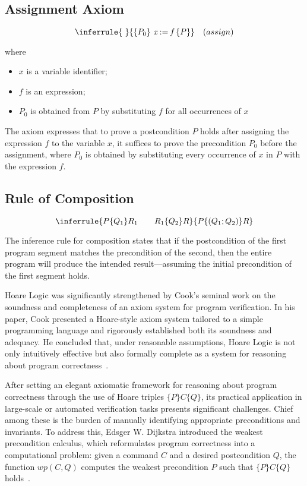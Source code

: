 \subsection{Assignment Axiom}

\[ 
  \inferrule
  { \ }
  {\{P_0\} \ \textit{x} := \textit{f} \ \{P\}}
  \quad (assign)
\]

where
\begin{itemize}
  \item{$x$ is a variable identifier;}
  \item{$f$ is an expression;}
  \item{$P_0$ is obtained from $P$ by substituting $f$ for all occurrences of $x$}
\end{itemize}

The axiom expresses that to prove a postcondition $P$ holds after assigning the expression $f$ to the variable $x$,
it suffices to prove the precondition $P_0$ before the assignment, where $P_0$ is obtained by substituting every occurrence of
$x$ in $P$ with the expression $f$.

\subsection{Rule of Composition}

\[ 
  \inferrule
  {P \{ Q_1 \} R_1 \quad \quad  R_1 \{ Q_2 \} R}
  {P \{ (Q_1 ; Q_2) \} R} 
\]

The inference rule for composition states that if the postcondition of the first program segment matches the precondition 
of the second, then the entire program will produce the intended result—assuming the initial precondition of the first 
segment holds.

Hoare Logic was significantly strengthened by Cook's seminal work on the soundness and completeness of an axiom system 
for program verification. In his paper, Cook presented a Hoare-style axiom system tailored to a simple programming language 
and rigorously established both its soundness and adequacy. He concluded that, under reasonable assumptions, Hoare Logic is 
not only intuitively effective but also formally complete as a system for reasoning about program correctness~\cite{0207005}.

After setting an elegant axiomatic framework for reasoning about program correctness through the use of Hoare triples 
$\{P\}C\{Q\}$, its practical application in large-scale or automated verification tasks presents significant challenges. 
Chief among these is the burden of manually identifying appropriate preconditions and invariants. To address this, 
Edsger W. Dijkstra introduced the weakest precondition calculus, which reformulates program correctness into a computational 
problem: given a command $C$ and a desired postcondition $Q$, the function $wp(C,Q)$ computes the weakest precondition $P$ 
such that $\{P\}C\{Q\}$ holds~\cite{Dijkstra76}.

